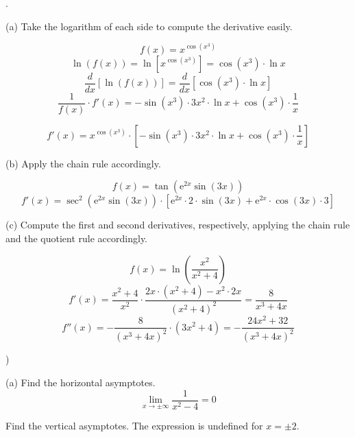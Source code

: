 \documentclass{article}
\begin{document}
.

\hfill

\noindent (a) Take the logarithm of each side to compute the derivative easily.

\[f(x)=x^{\cos\left(x^3\right)}\]
\[\ln(f(x))=\ln\left[x^{\cos\left(x^3\right)}\right]=\cos\left(x^3\right)\cdot\ln x\]
\[\frac{d}{dx}\left[\ln(f(x))\right] = \frac{d}{dx}\left[\cos\left(x^3\right)\cdot\ln x\right]\]
\[\frac{1}{f(x)}\cdot f'(x) = -\sin\left(x^3\right)\cdot 3x^2 \cdot \ln x + \cos\left(x^3\right)\cdot\frac1x\]

\[\boxed{f'(x) = x^{\cos\left(x^3\right)}\cdot\left[-\sin\left(x^3\right)\cdot 3x^2 \cdot \ln x + \cos\left(x^3\right)\cdot\frac1x\right]}\]

\hfill

\noindent (b) Apply the chain rule accordingly.

\begin{equation*}f(x) = \tan\left(\mathrm{e}^{2x}\sin(3x)\right)\end{equation*}
\begin{equation*}\boxed{f'(x) = \sec^2\left(\mathrm{e}^{2x}\sin(3x)\right)\cdot\left[\mathrm{e}^{2x}\cdot 2\cdot\sin(3x) + \mathrm{e}^{2x}\cdot\cos(3x)\cdot3\right]}\end{equation*}

\noindent (c) Compute the first and second derivatives, respectively, applying the chain rule and the quotient rule accordingly.

\begin{equation*}f(x) = \ln\left(\frac{x^2}{x^2+4}\right)\end{equation*}
\begin{equation*}f'(x)= \frac{x^2+4}{x^2}\cdot\frac{2x\cdot(x^2+4)-x^2\cdot2x}{\left(x^2+4\right)^2}=\frac{8}{x^3+4x}\end{equation*}
\begin{equation*}f''(x)= -\frac{8}{\left(x^3+4x\right)^2}\cdot\left(3x^2+4\right)=\boxed{-\frac{24x^2+32}{\left(x^3+4x\right)^2}}\end{equation*}

\hfill

)

\hfill

\noindent (a) Find the horizontal asymptotes.
\[\lim_{x\to\pm\infty}\frac{1}{x^2-4}=0\]

\hfill

\noindent Find the vertical asymptotes. The expression is undefined for $x=\pm2$.
\end{document}
